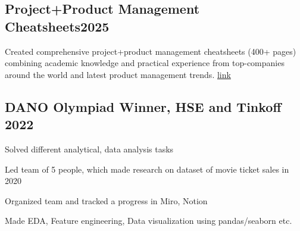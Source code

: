 \documentclass[a4paper, 12pt]{article}
\begin{document}
\subsection {{Project+Product Management Cheatsheets}\hfill 2025}
\begin{zitemize}
\item Created comprehensive project+product management cheatsheets (400+ pages) combining academic knowledge and practical experience from top-companies around the world and latest product management trends.
\href{http://slavikss.github.io/blog/pm-study}{link}
\end{zitemize}

\subsection{{DANO Olympiad Winner, HSE and Tinkoff }\hfill 2022}
\begin{zitemize}
\item Solved different analytical, data analysis tasks
\item Led team of 5 people, which made research on dataset of movie ticket sales in 2020
\item Organized team and tracked a progress in Miro, Notion
\item Made EDA, Feature engineering, Data visualization using pandas/seaborn etc.
\end{zitemize}
\end{document}
